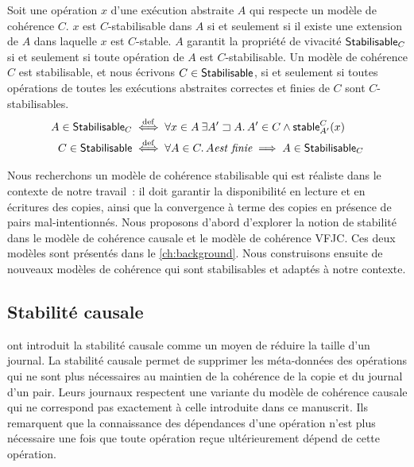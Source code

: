 \begin{definition}\label{def:stabilisable}
Soit une opération $x$ d'une exécution abstraite $A$ qui respecte un modèle de cohérence $C$.
$x$ est $C$-stabilisable dans $A$ si et seulement si il existe une extension de $A$ dans laquelle $x$ est $C$-stable.
$A$ garantit la propriété de vivacité $\operatorname{\mathsf{Stabilisable}}_C$ si et seulement si toute opération de $A$ est $C$-stabilisable.
Un modèle de cohérence $C$ est stabilisable, et nous écrivons $C \in \operatorname{\mathsf{Stabilisable}}$, si et seulement si toutes opérations de toutes les exécutions abstraites correctes et finies de $C$ sont $C$-stabilisables.
\begin{align*}
    A \in \operatorname{\mathsf{Stabilisable}}_C &\overset{\mathrm{def}}{\iff} \forall x \in A \:\exists A' \sqsupset A \ldotp A' \in C \land \operatorname{\mathsf{stable}}_{A'}^C(x)\\
    C \in \operatorname{\mathsf{Stabilisable}} &\overset{\mathrm{def}}{\iff} \forall A \in C \ldotp A \textit{est finie} \implies A \in \operatorname{\mathsf{Stabilisable}}_C
\end{align*}
\end{definition}

Nous recherchons un modèle de cohérence stabilisable qui est réaliste dans le contexte de notre travail~: il doit garantir la disponibilité en lecture et en écritures des copies, ainsi que la convergence à terme des copies en présence de pairs mal-intentionnés.
Nous proposons d'abord d'explorer la notion de stabilité dans le modèle de cohérence causale et le modèle de cohérence \acl{VFJC}.
Ces deux modèles sont présentés dans le \autoref{ch:background}.
Nous construisons ensuite de nouveaux modèles de cohérence qui sont stabilisables et adaptés à notre contexte.


\subsection{Stabilité causale}\label{subsec:cs}

\textcite{baquero_2018_pure-op-crdt} ont introduit la stabilité causale comme un moyen de réduire la taille d'un journal.
La stabilité causale permet de supprimer les méta-données des opérations qui ne sont plus nécessaires au maintien de la cohérence de la copie et du journal d'un pair.
Leurs journaux respectent une variante du modèle de cohérence causale qui ne correspond pas exactement à celle introduite dans ce manuscrit.
Ils remarquent que la connaissance des dépendances d'une opération n'est plus nécessaire une fois que toute opération reçue ultérieurement dépend de cette opération.

